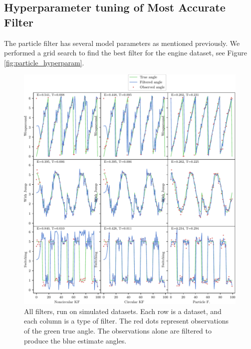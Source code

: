 \documentclass[11pt]{amsart}
\begin{document}
\subsection{Hyperparameter tuning of Most Accurate Filter}

The particle filter has several model parameters as mentioned previously. We performed a grid search
to find the best filter for the engine dataset, see Figure \ref{fig:particle_hyperparam}.


\begin{figure}[htp]
    \centering
    \includegraphics[width=.95\textwidth]{actual_paper_graphs/all_simulated.pdf}\hfill
    \caption{All filters, run on simulated datasets. Each row is a dataset, and each column is a type of filter. The red dots represent observations of the green true angle. The observations alone are filtered to produce the blue estimate angles.}
    \label{fig:all_simulated}
\end{figure}
\end{document}
